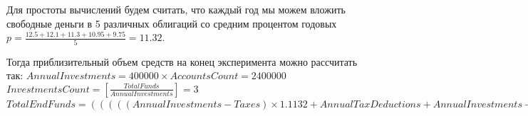 Для простоты вычислений будем считать, что каждый год мы можем вложить свободные деньги в 5 различных облигаций со средним процентом годовых
$p = \displaystyle{\frac{12.5 + 12.1 + 11.3 + 10.95 + 9.75}{5}} = 11.32$.

Тогда приблизительный объем средств на конец эксперимента можно рассчитать так:
$AnnualInvestments = 400 000 \times AccountsCount = 2 400 000$\\
$InvestmentsCount = \left[\displaystyle{\frac{TotalFunds}{AnnualInvestments}}\right] = 3$\\
$TotalEndFunds = (((((AnnualInvestments - Taxes) \times 1.1132 + AnnualTaxDeductions + AnnualInvestments - Taxes) \times 1.1132 + AnnualTaxDeductions + AnnualInvestments - Taxes) \times 1.1132 +
AnnualTaxDeduction - Taxes) \times 1.1132 - Taxes) \times 1.1132 + (TotalFunds - AnnualInvestments \times 3) \times 1.1132^5$ 

